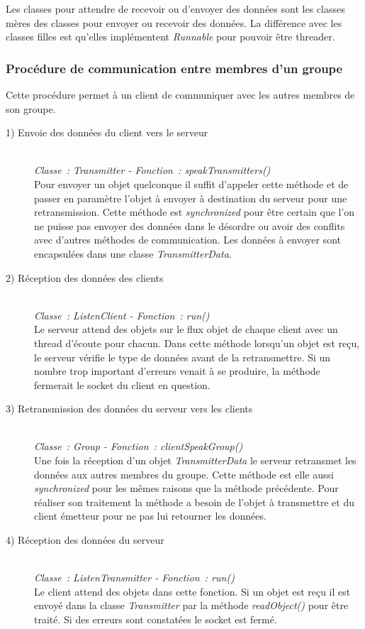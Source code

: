 \documentclass[a4paper, titlepage]{livret}
\begin{document}
  Les classes pour attendre de recevoir ou d’envoyer des données sont les classes mères des classes pour envoyer ou recevoir des données. La différence avec les classes filles est qu’elles implémentent \textit{Runnable} pour pouvoir être threader.

\subsubsection{Procédure de communication entre membres d’un groupe}
Cette procédure permet à un client de communiquer avec les autres membres de son groupe.
\begin{description}
  \item[1) Envoie des données du client vers le serveur]
    \textit{\\Classe : Transmitter - Fonction : speakTransmitters()\\}
	  Pour envoyer un objet quelconque il suffit d’appeler cette méthode et de passer en paramètre l’objet à envoyer à destination du serveur pour une retransmission. Cette méthode est \textit{synchronized} pour être certain que l’on ne puisse pas envoyer des données dans le désordre ou avoir des conflits avec d’autres méthodes de communication. Les données à envoyer sont encapsulées dans une classe \textit{TransmitterData}.
	
	\item[2) Réception des données des clients]
	\textit{\\Classe : ListenClient - Fonction : run()\\}
	  Le serveur attend des objets sur le flux objet de chaque client avec un thread d'écoute pour chacun.
Dans cette méthode lorsqu’un objet est reçu, le serveur vérifie le type de données avant de la retransmettre. Si un nombre trop important d’erreurs venait à se produire, la méthode fermerait le socket du client en question.

  \item[3) Retransmission des données du serveur vers les clients]
  \textit{\\Classe : Group - Fonction : clientSpeakGroup()\\}
    Une fois la réception d’un objet  \textit{TransmitterData} le serveur retransmet les données aux autres membres du groupe. Cette méthode est elle aussi  \textit{synchronized} pour les mêmes raisons que la méthode précédente. Pour réaliser son traitement la méthode a besoin de l’objet à transmettre et du client émetteur pour ne pas lui retourner les données.
    
  \item[4) Réception des données du serveur]
  \textit{\\Classe : ListenTransmitter - Fonction : run()\\}
    Le client attend des objets dans cette fonction. Si un objet est reçu il est envoyé dans la classe \textit{Transmitter} par la méthode \textit{readObject()} pour être traité. Si des erreurs sont constatées le socket est fermé.
\end{description}
\end{document}
